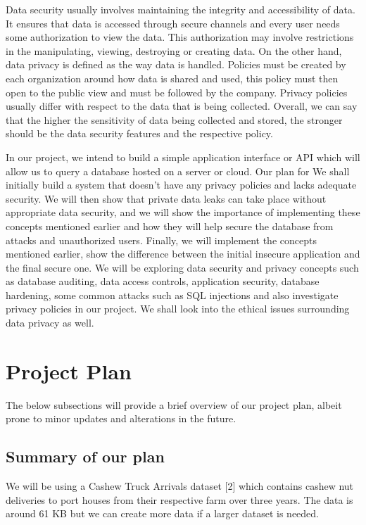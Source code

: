 \documentclass[sigconf]{acmart}
\begin{document}
Data security usually involves maintaining the integrity and accessibility of data. It ensures that data is accessed through secure channels and every user needs some authorization to view the data. This authorization may involve restrictions in the manipulating, viewing, destroying or creating data. On the other hand, data privacy is defined as the way data is handled. Policies must be created by each organization around how data is shared and used, this policy must then open to the public view and must be followed by the company. Privacy policies usually differ with respect to the data that is being collected. Overall, we can say that the higher the sensitivity of data being collected and stored, the stronger should be the data security features and the respective policy. 

In our project, we intend to build a simple application interface or API which will allow us to query a database hosted on a server or cloud. Our plan for  We shall initially build a system that doesn't have any privacy policies and lacks adequate security. We will then show that private data leaks can take place without appropriate data security, and we will show the importance of implementing these concepts mentioned earlier and how they will help secure the database from attacks and unauthorized users. Finally, we will implement the concepts mentioned earlier, show the difference between the initial insecure application and the final secure one. We will be exploring data security and privacy concepts such as database auditing, data access controls, application security, database hardening, some common attacks such as SQL injections and also investigate privacy policies in our project. We shall look into the ethical issues surrounding data privacy as well. 


\section{Project Plan}
The below subsections will provide a brief overview of our project plan, albeit prone to minor updates and alterations in the future.

\subsection{Summary of our plan}
We will be using a Cashew Truck Arrivals dataset [2] which contains cashew nut deliveries to port houses from their respective farm over three years. The data is around 61 KB but we can create more data if a larger dataset is needed. 
\end{document}
